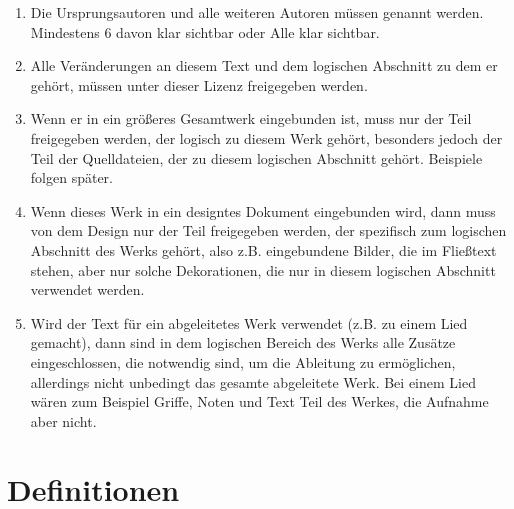 \documentclass[a4paper,10pt]{scrartcl}
\begin{document}
\begin{enumerate} 
\item Die Ursprungsautoren und alle weiteren Autoren müssen genannt werden. Mindestens 6 davon klar sichtbar oder Alle klar sichtbar. 

\item Alle Veränderungen an diesem Text und dem logischen Abschnitt zu dem er gehört, müssen unter dieser Lizenz freigegeben werden. 

\item Wenn er in ein größeres Gesamtwerk eingebunden ist, muss nur der Teil freigegeben werden, der logisch zu diesem Werk gehört, besonders jedoch der Teil der Quelldateien, der zu diesem logischen Abschnitt gehört. Beispiele folgen später. 

\item Wenn dieses Werk in ein designtes Dokument eingebunden wird, dann muss von dem Design nur der Teil freigegeben werden, der spezifisch zum logischen Abschnitt des Werks gehört, also z.B. eingebundene Bilder, die im Fließtext stehen, aber nur solche Dekorationen, die nur in diesem logischen Abschnitt verwendet werden. 

\item Wird der Text für ein abgeleitetes Werk verwendet (z.B. zu einem Lied gemacht), dann sind in dem logischen Bereich des Werks alle Zusätze eingeschlossen, die notwendig sind, um die Ableitung zu ermöglichen, allerdings nicht unbedingt das gesamte abgeleitete Werk. Bei einem Lied wären zum Beispiel Griffe, Noten und Text Teil des Werkes, die Aufnahme aber nicht. 
\end{enumerate}

\section{Definitionen}
\end{document}

